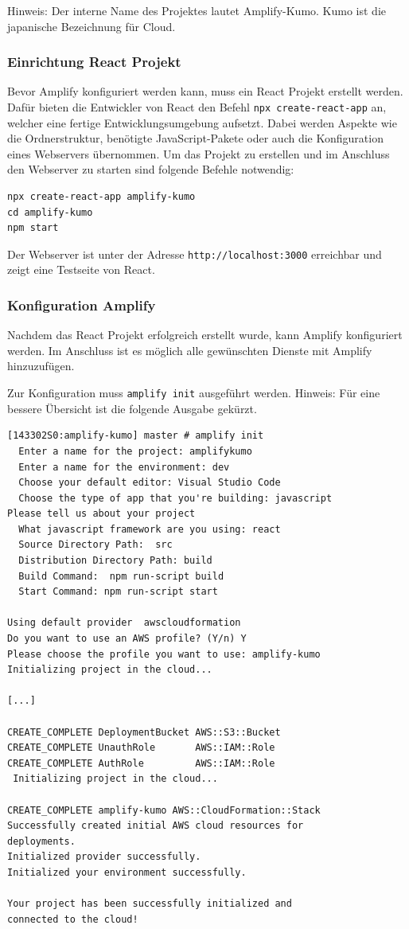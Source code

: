 Hinweis: Der interne Name des Projektes lautet Amplify-Kumo.
Kumo ist die japanische Bezeichnung für \glqq Cloud\grqq.


\subsubsection{Einrichtung React Projekt}

Bevor Amplify konfiguriert werden kann, muss ein React Projekt erstellt werden.
Dafür bieten die Entwickler von React den Befehl \verb+npx create-react-app+ an, welcher eine fertige Entwicklungsumgebung aufsetzt.
Dabei werden Aspekte wie die Ordnerstruktur, benötigte JavaScript-Pakete oder auch die Konfiguration eines Webservers übernommen.\cite[]{ReactNew}
Um das Projekt zu erstellen und im Anschluss den Webserver zu starten sind folgende Befehle notwendig:

\begin{verbatim}
npx create-react-app amplify-kumo
cd amplify-kumo
npm start
\end{verbatim}

Der Webserver ist unter der Adresse \verb+http://localhost:3000+ erreichbar und zeigt eine Testseite von React.


\subsubsection{Konfiguration Amplify}

Nachdem das React Projekt erfolgreich erstellt wurde, kann Amplify konfiguriert werden.
Im Anschluss ist es möglich alle gewünschten Dienste mit Amplify hinzuzufügen.

Zur Konfiguration muss \verb+amplify init+ ausgeführt werden.
Hinweis: Für eine bessere Übersicht ist die folgende Ausgabe gekürzt.

\begin{verbatim}
[143302S0:amplify-kumo] master # amplify init
  Enter a name for the project: amplifykumo
  Enter a name for the environment: dev
  Choose your default editor: Visual Studio Code
  Choose the type of app that you're building: javascript
Please tell us about your project
  What javascript framework are you using: react
  Source Directory Path:  src
  Distribution Directory Path: build
  Build Command:  npm run-script build
  Start Command: npm run-script start

Using default provider  awscloudformation
Do you want to use an AWS profile? (Y/n) Y
Please choose the profile you want to use: amplify-kumo
Initializing project in the cloud...

[...]

CREATE_COMPLETE DeploymentBucket AWS::S3::Bucket
CREATE_COMPLETE UnauthRole       AWS::IAM::Role
CREATE_COMPLETE AuthRole         AWS::IAM::Role
 Initializing project in the cloud...

CREATE_COMPLETE amplify-kumo AWS::CloudFormation::Stack
Successfully created initial AWS cloud resources for
deployments.
Initialized provider successfully.
Initialized your environment successfully.

Your project has been successfully initialized and
connected to the cloud!

\end{verbatim}

